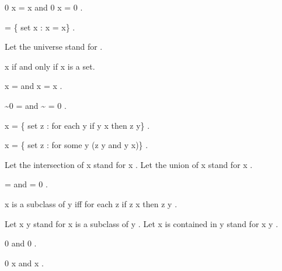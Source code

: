 \documentclass[a4paper,draft]{amsproc}
\begin{document}
\begin{forthel}
\begin{theorem}
 0 \cup x = x  and  0 \cap x = 0 .
\end{theorem}

\begin{definition}
	  = \{ set  x : x = x\} .
\end{definition}
Let the universe stand for   .

\begin{theorem}
 x \in {}  if and only if  x  is a set.
\end{theorem}

\begin{theorem}
 x \cup {} =   and  x \cap {} = x .
\end{theorem}

\begin{theorem}
 \sim 0 =   and  \sim {} = 0 .
\end{theorem}

\begin{definition}  \bigcap x = 
\{ set  z :  for each  y  if  y \in x  then  z \in y\} .\end{definition}

\begin{definition}  \bigcup x = 
\{ set  z :  for some  y   (z \in y  and  y \in x)\} .\end{definition}

Let the intersection of  x  stand for  \bigcap x .
Let the union of  x  stand for  \bigcup x .

\begin{theorem}
  =   and   = 0 .
\end{theorem}

\begin{definition}  x  is a subclass of  y  iff 
for each  z  if  z \in x  then  z \in y .
\end{definition}

Let  x \subset y  stand for  x  is a subclass of  y .
Let  x  is contained in  y  stand for  x \subset y .

\begin{lemma*}
 0   and  0  .
\end{lemma*}

\begin{theorem}
 0 \subset x  and  x \subset {} .
\end{theorem}


\end{forthel}
\end{document}
